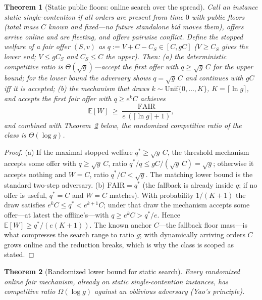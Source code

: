 \documentclass[11pt]{article}
\newtheorem{theorem}{Theorem}
\theoremstyle{remark}
\newcommand{\FAIR}{\mathrm{FAIR}}
\newcommand{\E}{\mathbb{E}}
\begin{document}
\begin{theorem}[Static public floors: online search over the spread]
\label{thm:onlineub}
Call an instance \emph{static single-contention} if all orders are
present from time $0$ with public floors (total mass $C$ known and
fixed---no future standalone bid moves them), offers arrive online and
are fleeting, and offers pairwise conflict. Define the \emph{stopped
welfare} of a fair offer $(S,v)$ as $q:=V+C-C_S\in[C,gC]$ ($V\ge C_S$
gives the lower end; $V\le gC_S$ and $C_S\le C$ the upper). Then:
(a) the deterministic competitive ratio is $\Theta(\sqrt g)$---accept
the first offer with $q\ge\sqrt g\,C$ for the upper bound; for the lower
bound the adversary shows $q=\sqrt g\,C$ and continues with $gC$ iff it
is accepted; (b) the mechanism that draws
$k\sim\mathrm{Unif}\{0,\dots,K\}$, $K=\lceil\ln g\rceil$, and accepts
the first fair offer with $q\ge e^kC$ achieves
\[
\E[W]\;\ge\;\frac{\FAIR}{e\,(\lceil\ln g\rceil+1)},
\]
and combined with Theorem~\ref{thm:onlinelb} below, the randomized
competitive ratio of the class is $\Theta(\log g)$.
\end{theorem}

\begin{proof}
(a) If the maximal stopped welfare $q^\ast\ge\sqrt g\,C$, the threshold
mechanism accepts some offer with $q\ge\sqrt g\,C$, ratio
$q^\ast/q\le gC/(\sqrt g\,C)=\sqrt g$; otherwise it accepts nothing and
$W=C$, ratio $q^\ast/C<\sqrt g$. The matching lower bound is the
standard two-step adversary. (b) $\FAIR=q^\ast$ (the fallback is already
inside $q$; if no offer is useful, $q^\ast=C$ and $W=C$ matches). With
probability $1/(K+1)$ the draw satisfies $e^kC\le q^\ast<e^{k+1}C$;
under that draw the mechanism accepts some offer---at latest the
offline's---with $q\ge e^kC>q^\ast/e$. Hence
$\E[W]\ge q^\ast/(e(K+1))$. The known anchor $C$---the fallback floor
mass---is what compresses the search range to ratio $g$; with
dynamically arriving orders $C$ grows online and the reduction breaks,
which is why the class is scoped as stated.
\end{proof}

\begin{theorem}[Randomized lower bound for static search]
\label{thm:onlinelb}
Every randomized online fair mechanism, already on static
single-contention instances, has competitive ratio $\Omega(\log g)$
against an oblivious adversary (Yao's principle).
\end{theorem}
\end{document}
